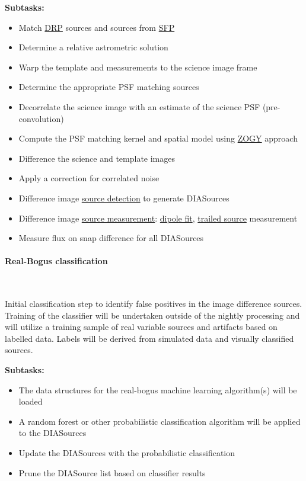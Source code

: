 \noindent
{\bf Subtasks:}
\begin{itemize}
\item Match \hyperref[sec:apSourcemeasurement]{DRP} sources and
  sources from \hyperref[sec:apSingleFrameProcessing]{SFP}
\item Determine a relative astrometric solution
\item Warp the template and measurements to the science image frame
\item Determine the appropriate PSF matching sources
\item Decorrelate the science image with an estimate of the science PSF (pre-convolution) 
\item Compute the PSF matching kernel and spatial model using
  \hyperref[sec:acDiffImDecorrelation]{ZOGY} approach
\item Difference the science and template images
\item Apply a correction for correlated noise
\item Difference image \hyperref[sec:acSourceDetection]{source
    detection} to generate DIASources
\item Difference image  \hyperref[sec:acMeasurement]{source
    measurement}: \hyperref[sec:acDipoleModels]{dipole fit}, \hyperref[sec:acTrailedPointSourceModels]{trailed source} measurement
\item Measure flux on snap difference for all DIASources
\end{itemize}

\paragraph{Real-Bogus classification}~

Initial classification step to identify false positives in the image
difference sources. Training of the classifier will be undertaken
outside of the nightly processing and will utilize a training sample
of real variable sources and artifacts based on labelled data. Labels
will be derived from simulated data and visually classified sources.

\noindent
{\bf Subtasks:}
\begin{itemize}
\item The data structures for the real-bogus machine learning
  algorithm(s) will be loaded
\item A random forest or other probabilistic classification algorithm will be
  applied to the DIASources
\item Update the DIASources with the probabilistic classification 
\item Prune the DIASource list based on classifier results
\end{itemize}


